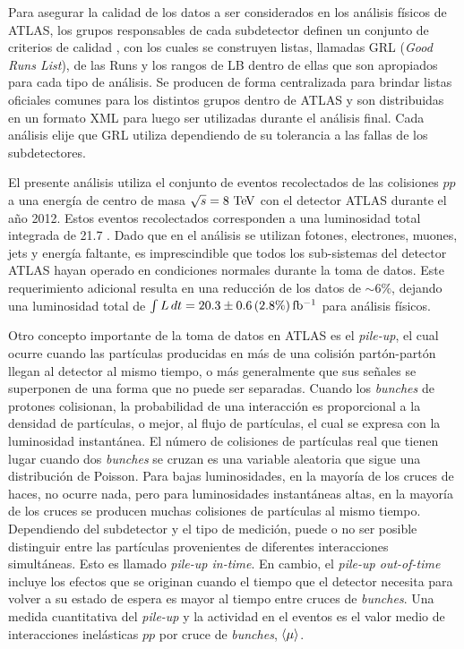 Para asegurar la calidad de los datos a ser considerados en los análisis físicos
de ATLAS, los grupos responsables de cada subdetector definen un conjunto de
criterios de calidad \cite{GRL}, con los cuales se construyen listas, llamadas
GRL (\emph{Good Runs List}), de las Runs y los rangos de LB dentro de ellas que
son apropiados para cada tipo de análisis. Se producen de forma centralizada
para brindar listas oficiales comunes para los distintos grupos dentro de ATLAS
y son distribuidas en un formato \textsc{XML} para luego ser utilizadas durante
el análisis final. Cada análisis elije que GRL utiliza dependiendo de su
tolerancia a las fallas de los subdetectores.

El presente análisis utiliza el conjunto de eventos recolectados de las colisiones
$pp$ a una energía de centro de masa $\sqrt{s} = 8\tev$ con el detector ATLAS
durante el a\~no 2012. Estos eventos recolectados corresponden a una luminosidad
total integrada de 21.7 \ifb. Dado que en el análisis se utilizan fotones, electrones,
muones, jets y energía faltante, es imprescindible que todos los sub-sistemas
del detector ATLAS hayan operado en condiciones normales durante la toma
de datos. Este requerimiento adicional resulta en una reducción de los datos de
$\sim 6\%$, dejando una luminosidad total de $\int L\, dt = 20.3 \pm 0.6\, (2.8
\%) \, \mbox{fb$^{-1}$}$\cite{lumi2012} para análisis físicos.

Otro concepto importante de la toma de datos en ATLAS es el \emph{pile-up}, el
cual ocurre cuando las partículas producidas en más de una colisión
partón-partón llegan al detector al mismo tiempo, o más generalmente que sus
señales se superponen de una forma que no puede ser separadas. Cuando los
\emph{bunches} de protones colisionan, la probabilidad de una interacción es
proporcional a la densidad de partículas, o mejor, al flujo de partículas, el
cual se expresa con la luminosidad instantánea. El número de colisiones de
partículas real que tienen lugar cuando dos \emph{bunches} se cruzan es una
variable aleatoria que sigue una distribución de Poisson. Para bajas
luminosidades, en la mayoría de los cruces de haces, no ocurre nada, pero para
luminosidades instantáneas altas, en la mayoría de los cruces se producen muchas
colisiones de partículas al mismo tiempo. Dependiendo del subdetector y el tipo
de medición, puede o no ser posible distinguir entre las partículas provenientes
de diferentes interacciones simultáneas. Esto es llamado \emph{pile-up in-time}.
En cambio, el \emph{pile-up out-of-time} incluye los efectos que se originan
cuando el tiempo que el detector necesita para volver a su estado de espera es
mayor al tiempo entre cruces de \emph{bunches}. Una medida cuantitativa del
\emph{pile-up} y la actividad en el eventos es el valor medio de interacciones
inelásticas $pp$ por cruce de \emph{bunches}, $\langle \mu \rangle$.

